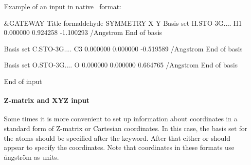 Example of an input in native \molcas\ format:
\begin{inputlisting}

 &GATEWAY
Title
formaldehyde
SYMMETRY
X Y
Basis set
H.STO-3G....
H1           0.000000    0.924258   -1.100293 /Angstrom
End of basis

Basis set
C.STO-3G....
C3           0.000000    0.000000   -0.519589 /Angstrom
End of basis

Basis set
O.STO-3G....
O            0.000000    0.000000    0.664765 /Angstrom
End of basis

End of input
\end{inputlisting}


\paragraph{Z-matrix and XYZ input}

Some times it is more convenient to set up information about coordinates in 
a standard form of Z-matrix or Cartesian coordinates. In this case, 
the basis set for the atoms should be specified after the 
keyword. After that either  or  should appear
to specify the coordinates. 
Note that coordinates in these formats use \aa ngstr\"om as units. 

